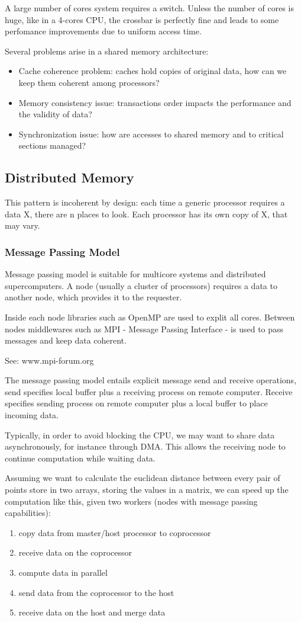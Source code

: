 A large number of cores system requires a switch. Unless the number of cores is huge, like in a 4-cores CPU, the crossbar is perfectly fine and leads to some perfomance improvements due to uniform access time.

Several problems arise in a shared memory architecture:
\begin{itemize}
  \item Cache coherence problem: caches hold copies of original data, how can we keep them coherent among processors? 
  \item Memory consistency issue: transactions order impacts the performance and the validity of data?
  \item Synchronization issue: how are accesses to shared memory and to critical sections managed?
\end{itemize}

\subsection{Distributed Memory}
This pattern is incoherent by design: each time a generic processor requires a data X, there are n places to look.
Each processor has its own copy of X, that may vary.

\subsubsection{Message Passing Model}
Message passing model is suitable for multicore systems and distributed supercomputers.
A node (usually a cluster of processors) requires a data to another node, which provides it to the requester.

Inside each node libraries such as OpenMP are used to explit all cores.
Between nodes middlewares such as MPI - Message Passing Interface - is used to pass messages and keep data coherent.

See: www.mpi-forum.org

The message passing model entails explicit message send and receive operations, send specifies local buffer plus a receiving process on remote computer.
Receive specifies sending process on remote computer plus a local buffer to place incoming data.

Typically, in order to avoid blocking the CPU, we may want to share data asynchronously, for instance through DMA.
This allows the receiving node to continue computation while waiting data.

Assuming we want to calculate the euclidean distance between every pair of points store in two arrays, storing the values in a matrix, we can speed up the computation like this, given two workers (nodes with message passing capabilities):
\begin{enumerate}
  \item copy data from master/host processor to coprocessor
  \item receive data on the coprocessor
  \item compute data in parallel
  \item send data from the coprocessor to the host
  \item receive data on the host and merge data
\end{enumerate}

